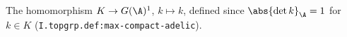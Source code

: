 The homomorphism $K\to G(\A)^1$, $k\mapsto k$, defined since $\abs{\det k}_\A=1$ for $k\in K$ (\texttt{I.topgrp.def:max-compact-adelic}).
